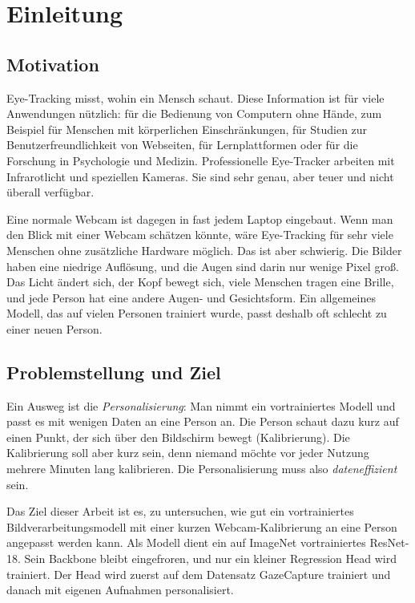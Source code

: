 \chapter{Einleitung}
\label{ch:einleitung}

\section{Motivation}
\label{sec:motivation}
Eye-Tracking misst, wohin ein Mensch schaut. Diese Information ist für viele
Anwendungen nützlich: für die Bedienung von Computern ohne Hände, zum
Beispiel für Menschen mit körperlichen Einschränkungen, für Studien zur
Benutzerfreundlichkeit von Webseiten, für Lernplattformen oder für die
Forschung in Psychologie und Medizin. Professionelle Eye-Tracker arbeiten mit
Infrarotlicht und speziellen Kameras. Sie sind sehr genau, aber teuer und
nicht überall verfügbar.

Eine normale Webcam ist dagegen in fast jedem Laptop eingebaut. Wenn man den
Blick mit einer Webcam schätzen könnte, wäre Eye-Tracking für sehr viele
Menschen ohne zusätzliche Hardware möglich. Das ist aber schwierig. Die Bilder
haben eine niedrige Auflösung, und die Augen sind darin nur wenige Pixel groß.
Das Licht ändert sich, der Kopf bewegt sich, viele Menschen tragen eine Brille,
und jede Person hat eine andere Augen- und Gesichtsform. Ein allgemeines Modell,
das auf vielen Personen trainiert wurde, passt deshalb oft schlecht zu einer
neuen Person.

\section{Problemstellung und Ziel}
\label{sec:ziel}
Ein Ausweg ist die \emph{Personalisierung}: Man nimmt ein vortrainiertes
Modell und passt es mit wenigen Daten an eine Person an. Die Person schaut dazu
kurz auf einen Punkt, der sich über den Bildschirm bewegt (Kalibrierung). Die
Kalibrierung soll aber kurz sein, denn niemand möchte vor jeder Nutzung
mehrere Minuten lang kalibrieren. Die Personalisierung muss also
\emph{dateneffizient} sein.

Das Ziel dieser Arbeit ist es, zu untersuchen, wie gut ein vortrainiertes
Bildverarbeitungsmodell mit einer kurzen Webcam-Kalibrierung an eine Person
angepasst werden kann. Als Modell dient ein auf ImageNet vortrainiertes
ResNet-18. Sein Backbone bleibt eingefroren, und nur ein kleiner
Regression Head wird trainiert. Der Head wird zuerst auf dem Datensatz
GazeCapture trainiert und danach mit eigenen Aufnahmen personalisiert.

